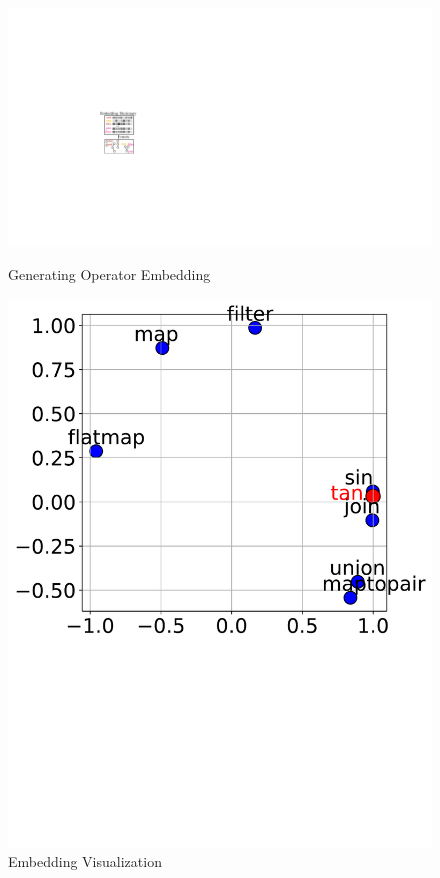 \begin{figure}[ht]
  \centering
  \begin{minipage}[b]{0.4\linewidth}
    \centering
    \includegraphics[width=\linewidth]{figures/embedding-training.pdf}
    \caption{Generating Operator Embedding}
    \label{fig:emb_training}
  \end{minipage}
  \quad
  \begin{minipage}[b]{0.55\linewidth}
    \centering
    \includegraphics[width=\linewidth]{figures/embedding_visual.pdf}
    \caption{Embedding Visualization}
    \label{fig:emb_visual}
  \end{minipage}
\end{figure}

